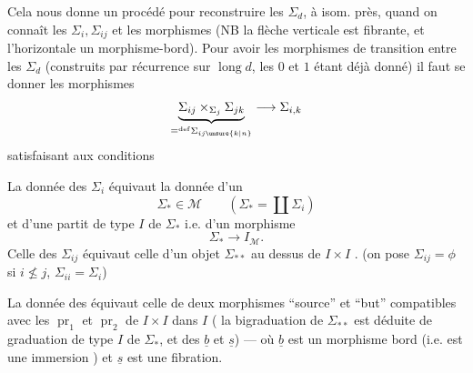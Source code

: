 Cela nous donne un procédé  pour
reconstruire les \(\Sigma_d\), à isom.  près,
quand on connaît les \(\Sigma_i,\Sigma_{ij}\)
 et les morphismes
(NB 
la flèche verticale est fibrante, et l'horizontale
un morphisme-bord). Pour avoir les
morphismes de transition entre les
\(\Sigma_d\) (construits par récurrence sur \(\operatorname{long}d\),
les \(0\) et \(1\) étant déjà donné) il faut se donner
les morphismes
\[
 \underbrace{\Sigma_{ij}\mathbin{\times_{\Sigma_j}}\Sigma_{jk}}
 _{\mathrel{\mathop=^{\mathrm{def}}}\Sigma_{ij\unsure{k|n}}}
 \longrightarrow\Sigma_{i,k}
\]
satisfaisant aux conditions



La donnée des \(\Sigma_i\) équivaut  la donnée d'un
\[
 \Sigma_*\in\mathcal M\qquad
 \left(\Sigma_*=\coprod\Sigma_i\right)
\]
et d'une partit de type \(I\) de \(\Sigma_*\) i.e. d'un morphisme
\[
 \Sigma_*\longrightarrow I_{\mathcal M}.
\]
Celle des \(\Sigma_{ij}\) équivaut  celle
d'un objet \(\Sigma_{**}\)  au dessus de \(I\times I\)
.
(on pose \(\Sigma_{ij}=\phi\) si \(i\not\le j\),
\(\Sigma_{ii}=\Sigma_i\))

La donnée des
équivaut  celle
de deux morphismes ``source'' et ``but''
\diagram{\begin{tikzcd}
 \Sigma_{**}\arrow[r,"\underline b"]\arrow[d,"\underline s"']&\Sigma_*\\
 \Sigma_*&
\end{tikzcd}}
compatibles avec les \(\operatorname{pr}_1\) et \(\operatorname{pr}_2\)
de \(I\times I\) dans \(I\)
(
 la bigraduation 
de \(\Sigma_{**}\) est déduite de 
graduation de type \(I\) de \(\Sigma_*\), et des
\(\underline b\) et \(\underline s\)) ---
où \(\underline b\) est 
un morphisme bord (i.e. est une
immersion ) et \(\underline s\) est une fibration.

